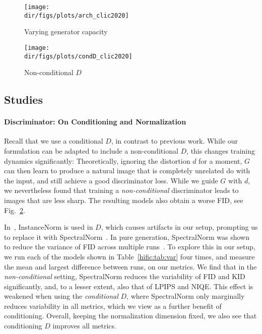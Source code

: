 
\begin{figure}[b]
    \centering
    \texttt{[image: \\dir/figs/plots/arch\_clic2020]}
    \caption{\label{hific:fig:num_res}Varying generator capacity}
\end{figure}

\begin{figure}[b]
    \centering
    \texttt{[image: \\dir/figs/plots/condD\_clic2020]}
    \caption{Non-conditional $D$\label{hific:fig:condD}}
\end{figure}

\subsection{Studies} \label{hific:sec:results:abl}

\paragraph{Discriminator: On Conditioning and Normalization}
Recall that we use a conditional $D$, in contrast to previous work. 
While our formulation can be adapted to include a non-conditional $D$, this changes training dynamics significantly: Theoretically, ignoring the distortion $d$ for a moment, $G$ can then learn to produce a natural image that is completely unrelated do with the input, and still achieve a good discriminator loss. 
While we guide $G$ with $d$, we nevertheless found that training a \emph{non-conditional} discriminator leads to images that are less sharp. The resulting models also obtain a worse FID, see Fig.~\ref{hific:fig:condD}. 

In~\cite{wang2018highres}, InstanceNorm is used in $D$, which causes artifacts in our setup, prompting us to replace it with SpectralNorm~\cite{miyato2018spectral}. In pure generation, SpectralNorm was shown to reduce the variance of FID across multiple runs~\cite{kurach2019large}.
To explore this in our setup, we run each of the models shown in Table~\ref{hific:tab:var} four times, and measure the mean and largest difference between runs, on our metrics. We find that in the \emph{non-conditional} setting, SpectralNorm reduces the variability of FID and KID significantly, and, to a lesser extent, also that of LPIPS and NIQE. This effect is weakened when using the \emph{conditional} $D$, where SpectralNorm only marginally reduces variability in all metrics, which we view as a further benefit of conditioning. Overall, keeping the normalization dimension fixed, we also see that conditioning $D$ improves all metrics. 

